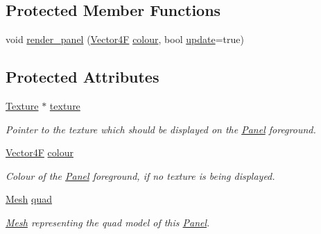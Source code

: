\subsection*{Protected Member Functions}
\begin{DoxyCompactItemize}
\item 
void \mbox{\hyperlink{class_panel_a9f81e58fd5b3d441a145d3aa5e222293}{render\+\_\+panel}} (\mbox{\hyperlink{class_vector4}{Vector4F}} \mbox{\hyperlink{class_panel_a7c38e08ad80eb9972428450fb639bf66}{colour}}, bool \mbox{\hyperlink{class_panel_a9e9c0608cf3139833cde6b73dc3ba443}{update}}=true)
\end{DoxyCompactItemize}
\subsection*{Protected Attributes}
\begin{DoxyCompactItemize}
\item 
\mbox{\label{class_panel_a682c2d8747451954095eb567b45d3fbd}} 
\mbox{\hyperlink{class_texture}{Texture}} $\ast$ \mbox{\hyperlink{class_panel_a682c2d8747451954095eb567b45d3fbd}{texture}}
\begin{DoxyCompactList}\small\item\em Pointer to the texture which should be displayed on the \mbox{\hyperlink{class_panel}{Panel}} foreground. \end{DoxyCompactList}\item 
\mbox{\label{class_panel_a7c38e08ad80eb9972428450fb639bf66}} 
\mbox{\hyperlink{class_vector4}{Vector4F}} \mbox{\hyperlink{class_panel_a7c38e08ad80eb9972428450fb639bf66}{colour}}
\begin{DoxyCompactList}\small\item\em Colour of the \mbox{\hyperlink{class_panel}{Panel}} foreground, if no texture is being displayed. \end{DoxyCompactList}\item 
\mbox{\label{class_panel_a3567eff819cd864ee8b6cbce5c01b274}} 
\mbox{\hyperlink{class_mesh}{Mesh}} \mbox{\hyperlink{class_panel_a3567eff819cd864ee8b6cbce5c01b274}{quad}}
\begin{DoxyCompactList}\small\item\em \mbox{\hyperlink{class_mesh}{Mesh}} representing the quad model of this \mbox{\hyperlink{class_panel}{Panel}}. \end{DoxyCompactList}\end{DoxyCompactItemize}


